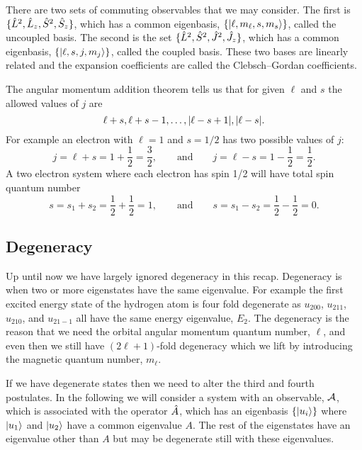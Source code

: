 There are two sets of commuting observables that we may consider.
The first is \(\{\hat{L}^2, \hat{L}_z, \hat{S}^2, \hat{S}_z\}\), which has a common eigenbasis, \(\{\vert {\ell, m_\ell, s, m_s} \rangle\}\), called the uncoupled basis.
The second is the set \(\{\hat{L}^2, \hat{S}^2, \hat{J}^2, \hat{J}_z\}\), which has a common eigenbasis, \(\{\vert {\ell, s, j, m_j} \rangle\}\), called the coupled basis.
These two bases are linearly related and the expansion coefficients are called the Clebsch--Gordan coefficients.

The angular momentum addition theorem tells us that for given \(\ell\) and \(s\) the allowed values of \(j\) are
\[\ell + s, \ell + s - 1, \dotsc, \abs{\ell - s + 1}, \abs{\ell - s}.\]
For example an electron with \(\ell = 1\) and \(s = 1/2\) has two possible values of \(j\):
\[j = \ell + s = 1 + \frac{1}{2} =\frac{3}{2}, \qquad\text{and}\qquad j = \ell - s = 1 - \frac{1}{2} = \frac{1}{2}.\]
A two electron system where each electron has spin 1/2 will have total spin quantum number
\[s = s_1 + s_2 = \frac{1}{2} + \frac{1}{2} = 1, \qquad\text{and}\qquad s = s_1 - s_2 = \frac{1}{2} - \frac{1}{2} = 0.\]

\subsection{Degeneracy}
Up until now we have largely ignored degeneracy in this recap.
Degeneracy is when two or more eigenstates have the same eigenvalue.
For example the first excited energy state of the hydrogen atom is four fold degenerate as \(u_{200}\), \(u_{211}\), \(u_{210}\), and \(u_{21{-}1}\) all have the same energy eigenvalue, \(E_2\).
The degeneracy is the reason that we need the orbital angular momentum quantum number, \(\ell\), and even then we still have \((2\ell + 1)\)-fold degeneracy which we lift by introducing the magnetic quantum number, \(m_\ell\).

If we have degenerate states then we need to alter the third and fourth postulates.
In the following we will consider a system with an observable, \(\mathcal{A}\), which is associated with the operator \(\hat{A}\), which has an eigenbasis \(\{\vert {u_i} \rangle\}\) where \(\vert {u_1} \rangle\) and \(\vert {u_2} \rangle\) have a common eigenvalue \(A\).
The rest of the eigenstates have an eigenvalue other than \(A\) but may be degenerate still with these eigenvalues.

